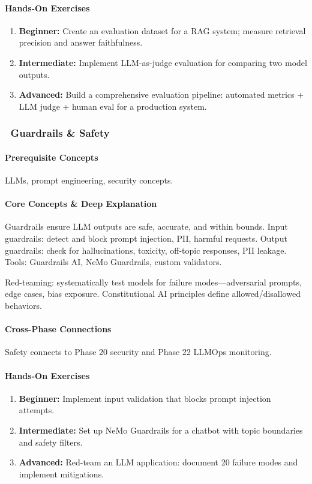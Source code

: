 \documentclass[11pt, a4paper, oneside]{report}
\newcommand{\mustmaster}[1]{\subsubsection{\texorpdfstring{\fcolorbox{blue!40!black}{blue!8}{\footnotesize\bfseries\color{blue!40!black} MUST MASTER}~#1}{#1}}}
\begin{document}
\paragraph{Hands-On Exercises}
\begin{enumerate}[leftmargin=*]
\item \textbf{Beginner:} Create an evaluation dataset for a RAG system; measure retrieval precision and answer faithfulness.
\item \textbf{Intermediate:} Implement LLM-as-judge evaluation for comparing two model outputs.
\item \textbf{Advanced:} Build a comprehensive evaluation pipeline: automated metrics + LLM judge + human eval for a production system.
\end{enumerate}

\mustmaster{Guardrails \& Safety}

\paragraph{Prerequisite Concepts} LLMs, prompt engineering, security concepts.

\paragraph{Core Concepts \& Deep Explanation} Guardrails ensure LLM outputs are safe, accurate, and within bounds. Input guardrails: detect and block prompt injection, PII, harmful requests. Output guardrails: check for hallucinations, toxicity, off-topic responses, PII leakage. Tools: Guardrails AI, NeMo Guardrails, custom validators.

Red-teaming: systematically test models for failure modes---adversarial prompts, edge cases, bias exposure. Constitutional AI principles define allowed/disallowed behaviors.

\paragraph{Cross-Phase Connections} Safety connects to Phase 20 security and Phase 22 LLMOps monitoring.

\paragraph{Hands-On Exercises}
\begin{enumerate}[leftmargin=*]
\item \textbf{Beginner:} Implement input validation that blocks prompt injection attempts.
\item \textbf{Intermediate:} Set up NeMo Guardrails for a chatbot with topic boundaries and safety filters.
\item \textbf{Advanced:} Red-team an LLM application: document 20 failure modes and implement mitigations.
\end{enumerate}
\end{document}
